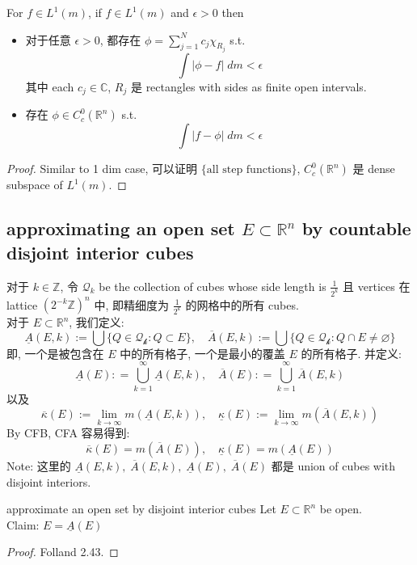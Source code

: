 \documentclass[lang=cn,11pt]{elegantbook}
\begin{document}
\begin{corollary}
For $f \in L^1(m)$, 
    if $f \in L^1 (m)$ and $\epsilon > 0$ then \begin{itemize}
        \item 对于任意 $\epsilon>0$, 都存在 $\phi = \sum_{j=1}^N c_j \chi_{R_j} $ s.t. \[\int |\phi - f|\; dm < \epsilon  \]其中 each $c_j \in \mathbb{C}$, $R_j$ 是 rectangles with sides as finite open intervals.
        \item 存在 $\phi \in C_c^0(\mathbb{R}^n)$ s.t. \[\int |f - \phi| \; dm < \epsilon \]
    \end{itemize}
\end{corollary}
\begin{proof}
Similar to 1 dim case, 可以证明 $\{\text{all step functions}\}$, $C_c^0(\mathbb{R}^n)$ 是 dense subspace of $L^1(m)$.
\end{proof}



\subsection{approximating an open set $E\subset \mathbb{R}^n$ by countable disjoint interior cubes}
对于 $k \in \mathbb{Z}$, 令 $\mathcal{Q}_k$ be the collection of cubes whose side length is $\frac{1}{2^k}$ 且 vertices 在 lattice $(2^{-k} \mathbb{Z})^n$ 中, 即精细度为 $\frac{1}{2^k}$ 的网格中的所有 cubes.\\
对于 $E\subset \mathbb{R}^n$, 我们定义: \[
\underline{A}(E,k) := \bigcup \{Q \in \mathcal{Q_k} : Q \subset E\},\quad \overline{A}(E,k) := \bigcup \{Q \in \mathcal{Q_k} : Q \cap E \not = \varnothing\}
\]
即, 一个是被包含在 $E$ 中的所有格子, 一个是最小的覆盖 $E$ 的所有格子.
并定义: \[
\underline{A}(E) : = \bigcup_{k=1}^\infty \underline{A}(E,k),\quad \overline{A}(E) : = \bigcup_{k=1}^\infty \overline{A}(E,k)
\]以及
\[
\overline{\kappa}(E) := \lim_{k\to\infty}m(\underline{A}(E,k)), \quad \underline{\kappa}(E) := \lim_{k\to\infty}m(\overline{A}(E,k))
\]
By CFB, CFA 容易得到: \[
\overline{\kappa}(E) = m(\overline{A}(E)) ,\quad \underline{\kappa}(E) = m(\underline{A}(E)) 
\]
Note: 这里的 $\underline{A}(E,k), \; \overline{A}(E,k), \; \underline{A}(E), \; \overline{A}(E)$ 都是 union of cubes with disjoint interiors.
\begin{lemma}{approximate an open set by disjoint interior cubes}
Let $E\subset \mathbb{R}^n$ be open.\\
Claim: $E = \underline{A}(E)$
\end{lemma}
\begin{proof}
    Folland 2.43.
\end{proof}
\end{document}
